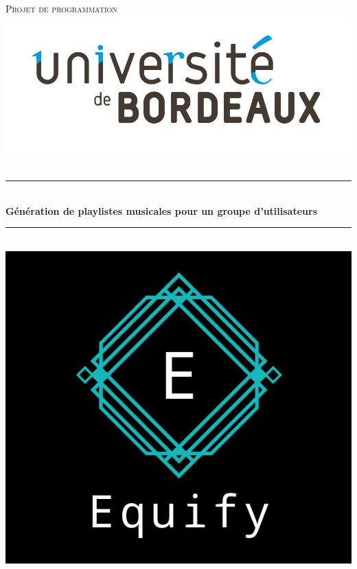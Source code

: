 \documentclass[12pt, openany]{report}
\newcommand{\HRule}{\rule{\linewidth}{0.5mm}}
\begin{document}
\begin{titlepage}
  \begin{sffamily}
  \begin{center}

    \textsc{\LARGE Projet de programmation}\\[0.3cm]
    
    \includegraphics[scale=0.35]{images/img2.jpg}~\\[0.8cm]

    \HRule \\[0.4cm]
    { \huge \bfseries Génération de playlistes musicales pour un groupe d’utilisateurs\\[0.4cm] }
    
    \HRule \\[1.5cm]
    \includegraphics[scale=0.4]{images/img1.png}
    \\[1.5cm]


\end{center}
\end{sffamily}
\end{titlepage}
\end{document}

